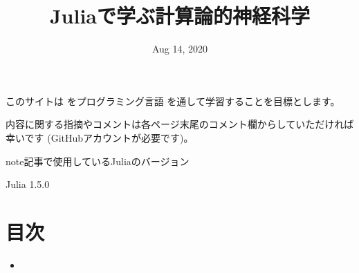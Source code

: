 \documentclass[letterpaper,10pt,english]{sphinxmanual}
\title{Juliaで学ぶ計算論的神経科学}
\date{Aug 14, 2020}
\author{}
\begin{document}
\pagestyle{empty}
\sphinxmaketitle
\pagestyle{plain}
\sphinxtableofcontents
\pagestyle{normal}
\label{\detokenize{index::doc}}


このサイトは をプログラミング言語 を通して学習することを目標とします。

内容に関する指摘やコメントは各ページ末尾のコメント欄からしていただければ幸いです (GitHubアカウントが必要です)。

\begin{sphinxadmonition}{note}{記事で使用しているJuliaのバージョン}

Julia 1.5.0
\end{sphinxadmonition}


\chapter{目次}
\label{\detokenize{index:id1}}\begin{itemize}
\item {} 

\end{itemize}
\end{document}
